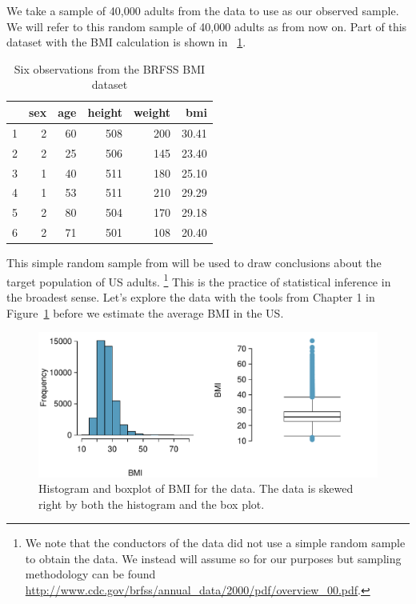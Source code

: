 We take a sample of 40,000 adults from the  data to use as our observed sample. We will refer to this random sample of 40,000 adults as  from now on. Part of this dataset with the BMI calculation is shown in ~\ref{brfssBMIData}. 


\begin{table}[ht]
\centering
\begin{tabular}{rrrrrr}
  \hline
 & sex & age & height & weight & bmi \\ 
  \hline
1 &   2 &  60 & 508 & 200 & 30.41 \\ 
  2 &   2 &  25 & 506 & 145 & 23.40 \\ 
  3 &   1 &  40 & 511 & 180 & 25.10 \\ 
  4 &   1 &  53 & 511 & 210 & 29.29 \\ 
  5 &   2 &  80 & 504 & 170 & 29.18 \\ 
  6 &   2 &  71 & 501 & 108 & 20.40 \\ 
   \hline
\end{tabular}
\caption{Six observations from the BRFSS BMI dataset} 
\label{brfssBMIData}
\end{table}


This simple random sample from  will be used to draw conclusions about the target population of US adults. \footnote{We note that the conductors of the  data did not use a simple random sample to obtain the data. We instead will assume so for our purposes but sampling methodology can be found \url{http://www.cdc.gov/brfss/annual_data/2000/pdf/overview_00.pdf}.} This is the practice of statistical inference in the broadest sense. Let's explore the data with the tools from Chapter 1 in Figure~\ref{exploreBMI} before we estimate the average BMI in the US. 

\begin{figure}
\centering
\includegraphics[width =  \textwidth]{ch_inference_foundations_oi_biostat/figures/brfssBMIsampHistograms/brfssBMIsampHistograms}
\caption{Histogram and boxplot of BMI for the  data. The data is skewed right by both the histogram and the box plot.}
\label{exploreBMI}
\end{figure}

